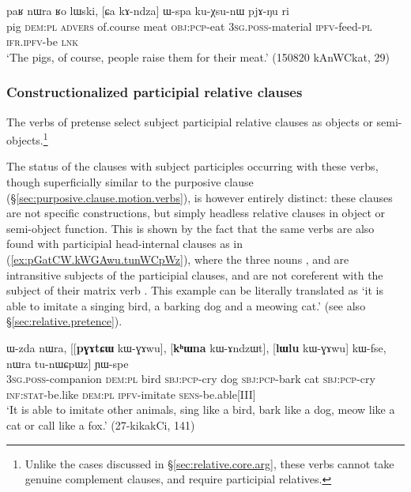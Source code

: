 \begin{exe}
	\ex \label{ex:Ca.kAndza.Wspa}
	\gll paʁ nɯra ʁo lɯski, [ɕa kɤ-ndza] ɯ-spa ku-χsu-nɯ pjɤ-ŋu ri \\
	pig \textsc{dem}:\textsc{pl} \textsc{advers} of.course meat \textsc{obj}:\textsc{pcp}-eat \textsc{3sg}.\textsc{poss}-material \textsc{ipfv}-feed-\textsc{pl} \textsc{ifr}.\textsc{ipfv}-be \textsc{lnk} \\
	\glt `The pigs, of course, people raise them for their meat.' (150820 kAnWCkat, 29)
\end{exe}



\subsubsection{Constructionalized participial relative clauses} \label{sec:constr.participial.clause}
The verbs of pretense select subject participial relative clauses as objects or semi-objects.\footnote{Unlike the cases discussed in §\ref{sec:relative.core.arg}, these verbs cannot take genuine complement clauses, and require participial relatives. } 

The status of the clauses with subject participles occurring with these verbs, though superficially similar to the purposive clause (§\ref{sec:purposive.clause.motion.verbs}), is however entirely distinct: these clauses are not specific constructions, but simply headless relative clauses in object or semi-object function. This is shown by the fact that the same verbs are also found with participial head-internal clauses as in (\ref{ex:pGatCW.kWGAwu.tunWCpWz}), where the three nouns ,  and  are intransitive subjects of the participial clauses, and are not coreferent with the subject of their matrix verb . This example can be literally translated as `it is able to imitate a singing bird, a barking dog and a meowing cat.' (see also  §\ref{sec:relative.pretence}).

\begin{exe}
	\ex \label{ex:pGatCW.kWGAwu.tunWCpWz}
	\gll ɯ-zda nɯra, [[\textbf{pɣɤtɕɯ} kɯ-ɣɤwu], [\textbf{kʰɯna} kɯ-ɤndzɯt], [\textbf{lɯlu} kɯ-ɣɤwu] kɯ-fse, nɯra tu-nɯɕpɯz] ɲɯ-spe \\
	\textsc{3sg}.\textsc{poss}-companion \textsc{dem}:\textsc{pl} bird \textsc{sbj}:\textsc{pcp}-cry dog \textsc{sbj}:\textsc{pcp}-bark cat \textsc{sbj}:\textsc{pcp}-cry \textsc{inf}:\textsc{stat}-be.like \textsc{dem}:\textsc{pl} \textsc{ipfv}-imitate \textsc{sens}-be.able[III] \\
	\glt `It is able to imitate other animals, sing like a bird, bark like a dog, meow like a cat or call like a fox.' (27-kikakCi, 141)
\end{exe}


